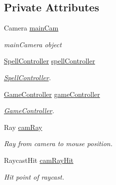 \subsection*{Private Attributes}
\begin{DoxyCompactItemize}
\item 
Camera \hyperlink{class_shooting_aim_line_a7198b2c13fc8ce0a388f82138362cd67}{main\+Cam}
\begin{DoxyCompactList}\small\item\em main\+Camera object \end{DoxyCompactList}\item 
\mbox{\label{class_shooting_aim_line_a10ac775070726d01148aafc2471aab2a}} 
\hyperlink{class_spell_controller}{Spell\+Controller} \hyperlink{class_shooting_aim_line_a10ac775070726d01148aafc2471aab2a}{spell\+Controller}
\begin{DoxyCompactList}\small\item\em \hyperlink{class_spell_controller}{Spell\+Controller}. \end{DoxyCompactList}\item 
\mbox{\label{class_shooting_aim_line_ae75dab10b6a07d162b97fe42d3c7075c}} 
\hyperlink{class_game_controller}{Game\+Controller} \hyperlink{class_shooting_aim_line_ae75dab10b6a07d162b97fe42d3c7075c}{game\+Controller}
\begin{DoxyCompactList}\small\item\em \hyperlink{class_game_controller}{Game\+Controller}. \end{DoxyCompactList}\item 
\mbox{\label{class_shooting_aim_line_aa696032892218780a70cb35f9891358f}} 
Ray \hyperlink{class_shooting_aim_line_aa696032892218780a70cb35f9891358f}{cam\+Ray}
\begin{DoxyCompactList}\small\item\em Ray from camera to mouse position. \end{DoxyCompactList}\item 
\mbox{\label{class_shooting_aim_line_a1a7e152ffea8365e17c6c5515e8f738f}} 
Raycast\+Hit \hyperlink{class_shooting_aim_line_a1a7e152ffea8365e17c6c5515e8f738f}{cam\+Ray\+Hit}
\begin{DoxyCompactList}\small\item\em Hit point of raycast. \end{DoxyCompactList}\item 

\end{DoxyCompactItemize}
